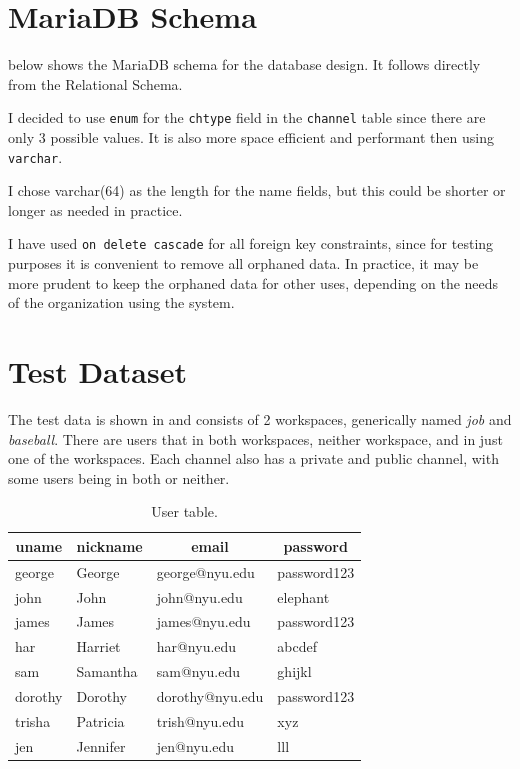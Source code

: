 \documentclass{article}
\begin{document}
\section{MariaDB Schema}

 below shows the MariaDB schema for the database design. It follows directly from the Relational Schema.



I decided to use \texttt{enum} for the \texttt{chtype} field in the \texttt{channel} table since there are only 3 possible values. It is also more space efficient and performant then using \texttt{varchar}.

I chose varchar(64) as the length for the name fields, but this could be shorter or longer as needed in practice.

I have used \texttt{on delete cascade} for all foreign key constraints, since for testing purposes it is convenient to remove all orphaned data. In practice, it may be more prudent to keep the orphaned data for other uses, depending on the needs of the organization using the system.

\section{Test Dataset}

The test data is shown in  and consists of 2 workspaces, generically named \textit{job} and \textit{baseball}. There are users that in both workspaces, neither workspace, and in just one of the workspaces. Each channel also has a private and public channel, with some users being in both or neither.


\begin{table}[!p]
\centering
\begin{tabular}{l l l l}
\toprule
\multicolumn{1}{c}{uname} &
\multicolumn{1}{c}{nickname} &
\multicolumn{1}{c}{email} &
\multicolumn{1}{c}{password} \\
\midrule
george  & George    & george@nyu.edu  & password123     \\
john    & John      & john@nyu.edu    & elephant        \\
james   & James     & james@nyu.edu   & password123     \\
har     & Harriet   & har@nyu.edu     & abcdef          \\
sam     & Samantha  & sam@nyu.edu     & ghijkl          \\
dorothy & Dorothy   & dorothy@nyu.edu & password123     \\
trisha  & Patricia  & trish@nyu.edu   & xyz             \\
jen     & Jennifer  & jen@nyu.edu     & lll             \\
\bottomrule
\end{tabular}
\caption{User table.}
\label{tbl:user}
\end{table}
\end{document}
